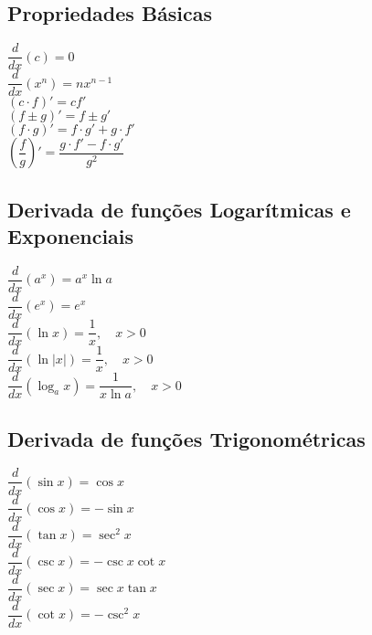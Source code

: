 \subsection*{Propriedades Básicas}
\begin{tcolorbox}
\begin{multicols}{3}
$\dfrac{d}{dx}(c)=0$\\[0.5cm]
$\dfrac{d}{dx}\left(x^n\right)= nx^{n-1}$\\[0.5cm]
$(c\cdot f)'= cf'$\\[0.5cm]
$(f\pm g)'=f\pm g'$\\[0.5cm]
$(f\cdot g)'=f\cdot g' + g\cdot f'$\\[0.5cm]
$\left(\dfrac{f}{g}\right)'=\dfrac{g\cdot f'-f\cdot g'}{g^2}$
\end{multicols}
\end{tcolorbox}

\subsection*{Derivada de funções Logarítmicas e Exponenciais}
\begin{tcolorbox}
\begin{multicols}{3}
$\dfrac{d}{dx}\left(a^x\right)=a^x\ln{a}$\\[0.5cm]
$\dfrac{d}{dx}\left(e^{x}\right)=e^x$\\[0.5cm]
$\dfrac{d}{dx}\left(\ln{x}\right)=\dfrac{1}{x},\quad x>0$\\[0.5cm]
$\dfrac{d}{dx}\left(\ln{|x|}\right)=\dfrac{1}{x},\quad x>0$\\[0.5cm]
$\dfrac{d}{dx}\left(\log_a{x}\right)=\dfrac{1}{x\ln{a}},\quad x>0$\\[0.5cm]
\end{multicols}
\end{tcolorbox}

\subsection*{Derivada de funções Trigonométricas}
\begin{tcolorbox}
\begin{multicols}{3}
$\dfrac{d}{dx}\left(\sin{x}\right)=\cos{x}$\\[0.5cm]
$\dfrac{d}{dx}\left(\cos{x}\right)=-\sin{x}$\\[0.5cm]
$\dfrac{d}{dx}\left(\tan{x}\right)=\sec^2{x}$\\[0.5cm]
$\dfrac{d}{dx}\left(\csc{x}\right)=-\csc{x}\cot{x}$\\[0.5cm]
$\dfrac{d}{dx}\left(\sec{x}\right)=\sec{x}\tan{x}$\\[0.5cm]
$\dfrac{d}{dx}\left(\cot{x}\right)=-\csc^2{x}$\\
\end{multicols}
\end{tcolorbox}

